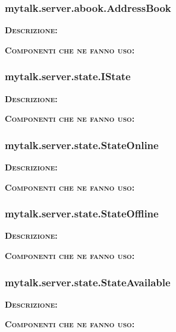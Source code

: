 \subsubsection{mytalk.server.abook.AddressBook}
\begin{description}
	\item{\scshape\bfseries Descrizione:} 
	\item{\scshape\bfseries Componenti che ne fanno uso:} 
\end{description}

\subsubsection{mytalk.server.state.IState}
\begin{description}
	\item{\scshape\bfseries Descrizione:} 
	\item{\scshape\bfseries Componenti che ne fanno uso:} 
\end{description}

\subsubsection{mytalk.server.state.StateOnline}
\begin{description}
	\item{\scshape\bfseries Descrizione:} 
	\item{\scshape\bfseries Componenti che ne fanno uso:} 
\end{description}

\subsubsection{mytalk.server.state.StateOffline}
\begin{description}
	\item{\scshape\bfseries Descrizione:} 
	\item{\scshape\bfseries Componenti che ne fanno uso:} 
\end{description}

\subsubsection{mytalk.server.state.StateAvailable}
\begin{description}
	\item{\scshape\bfseries Descrizione:} 
	\item{\scshape\bfseries Componenti che ne fanno uso:} 
\end{description}

